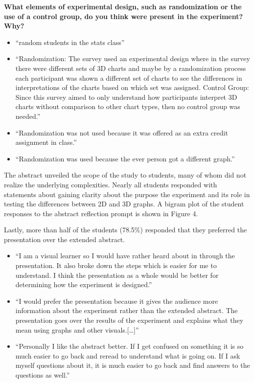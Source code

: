 \documentclass[
]{article}
\begin{document}
\textbf{What elements of experimental design, such as randomization or
the use of a control group, do you think were present in the experiment?
Why?}

\begin{itemize}
\item
  ``random students in the stats class''
\item
  ``Randomization: The survey used an experimental design where in the
  survey there were different sets of 3D charts and maybe by a
  randomization process each participant was shown a different set of
  charts to see the differences in interpretations of the charts based
  on which set was assigned. Control Group: Since this survey aimed to
  only understand how participants interpret 3D charts without
  comparison to other chart types, then no control group was needed.''
\item
  ``Randomization was not used because it was offered as an extra credit
  assignment in class.''
\item
  ``Randomization was used because the ever person got a different
  graph.''
\end{itemize}

The abstract unveiled the scope of the study to students, many of whom
did not realize the underlying complexities. Nearly all students
responded with statements about gaining clarity about the purpose the
experiment and its role in testing the differences between 2D and 3D
graphs. A bigram plot of the student responses to the abstract
reflection prompt is shown in Figure 4.

Lastly, more than half of the students (78.5\%) responded that they
preferred the presentation over the extended abstract.

\begin{itemize}
\item
  ``I am a visual learner so I would have rather heard about in through
  the presentation. It also broke down the steps which is easier for me
  to understand. I think the presentation as a whole would be better for
  determining how the experiment is designed.''
\item
  ``I would prefer the presentation because it gives the audience more
  information about the experiment rather than the extended abstract.
  The presentation goes over the results of the experiment and explains
  what they mean using graphs and other visuals.{[}\ldots{]}''
\item
  ``Personally I like the abstract better. If I get confused on
  something it is so much easier to go back and reread to understand
  what is going on. If I ask myself questions about it, it is much
  easier to go back and find answers to the questions as well.''
\end{itemize}
\end{document}
